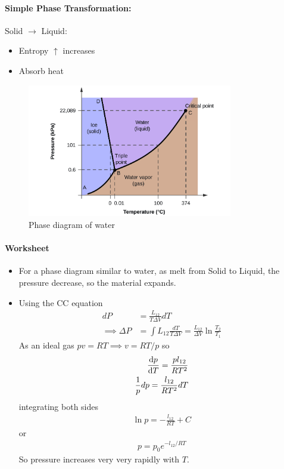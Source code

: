 \documentclass[../main.tex]{subfiles}
\begin{document}
\newpage
\paragraph{Simple Phase Transformation:} Solid $\to$ Liquid:
\begin{itemize}
    \item Entropy $\uparrow$ increases
    \item Absorb heat
\end{itemize}

\begin{figure}[ht]
    \centering
    \includegraphics[width=0.8\textwidth]{water_pt.png}
    \caption{Phase diagram of water}
    \label{fig:water_pt}
\end{figure}

\paragraph{Worksheet}
\begin{itemize}
    \item For a phase diagram similar to water, as melt from Solid to Liquid,
    the pressure decrease, so the material expands.
    \item Using the CC equation
    \begin{align*}
        dP &= \frac{L_{12}}{T \Delta V}  dT \\
        \implies \Delta P &= \int L_{12} \frac{dT}{T \Delta V} = \frac{L_{12}}{\Delta V} \ln \frac{T_2}{T_1}
    \end{align*}
    As an ideal gas $pv = RT \implies v = RT / p$ so 
    \begin{align*}
        \dv{p}{T} = \frac{p l_{12}}{RT^2} \\
        \frac{1}{p} dp = \frac{l_{12}}{RT^2} dT
    \end{align*}
    integrating both sides
    \begin{align*}
        \ln p = -\frac{l_{12}}{RT} + C
    \end{align*}
    or
    \begin{align*}
        p = p_0 e^{-l_{12}/RT}
    \end{align*}
    So pressure increases very very rapidly with $T$.
\end{itemize}
\end{document}
